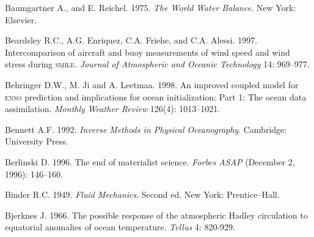 \begin{thebibliography}{999}
Baumgartner A., and E. Reichel.  1975. \textit{The World Water
  Balance}.  New York: Elsevier.
%

Beardsley R.C., A.G. Enriquez, C.A. Friehe, and C.A. Alessi. 1997.
Intercomparison of aircraft and buoy measurements of wind speed and
wind stress during \textsc{smile}. \textit{Journal of Atmospheric and
  Oceanic Technology} 14: 969--977.
%

Behringer D.W., M. Ji and A. Leetmaa.  1998. An improved coupled model
for \textsc{enso} prediction and implications for ocean
initialization: Part 1: The ocean data assimilation. \textit{Monthly
  Weather Review} 126(4): 1013--1021.
%

Bennett A.F.  1992. \textit{Inverse Methods in Physical Oceanography}.
Cambridge: University Press.
%

Berlinski D.  1996. The end of materialist science. \textit{Forbes
  ASAP} (December 2, 1996): 146--160.
%

Binder R.C.  1949. \textit{Fluid Mechanics}. Second ed. New York:
Prentice--Hall.
%

Bjerknes J.  1966. The possible response of the atmospheric Hadley
circulation to equatorial anomalies of ocean
temperature. \textit{Tellus} 4: 820-929.
%


\end{thebibliography}
